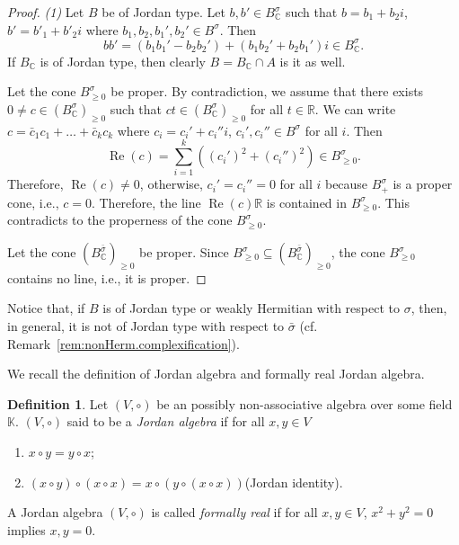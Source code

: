 \documentclass[a4paper,oneside,11pt]{amsart}
\DeclareMathOperator{\Ree}{Re}
\newcommand{\R}{\mathbb R}
\newcommand{\K}{\mathbb K}
\theoremstyle{plain}
\theoremstyle{definition}
\newtheorem{df}[teo]{Definition}
\theoremstyle{remark}
\newcommand{\defin}{\emph}
\begin{document}
\begin{proof}
    {\it (1)} Let $B$ be of Jordan type. Let $b,b'\in B_\mathbb C^\sigma$ such that $b=b_1+b_2i$, $b'=b'_1+b'_2i$ where $b_1,b_2,b_1',b_2'\in B^\sigma$. Then 
    $$bb'=(b_1b_1'-b_2b_2')+(b_1b_2'+b_2b_1')i\in B^\sigma_\mathbb C.$$
    If $B_\mathbb C$ is of Jordan type, then clearly $B=B_\mathbb C\cap A$ is it as well.

\vspace{2mm}
     Let the cone $B^\sigma_{\geq 0}$ be proper. By contradiction, we assume that there exists $0\neq c\in (B^\sigma_\mathbb C)_{\geq 0}$ such that $ct\in (B^\sigma_\mathbb C)_{\geq 0}$ for all $t\in\R$. We can write $c=\bar c_1 c_1+\dots+\bar c_k c_k$ where $c_i=c_i'+c_i''i$, $c_i',c_i''\in B^\sigma$ for all $i$. Then
    $$\Ree(c)=\sum_{i=1}^k\left((c_i')^2+(c_i'')^2\right)\in B^\sigma_{\geq 0}.$$
    Therefore, $\Ree(c)\neq 0$, otherwise, $c_i'=c_i''=0$ for all $i$ because $B^\sigma_+$ is a proper cone, i.e., $c=0$. Therefore, the line $\Ree(c)\R$ is contained in $B^\sigma_{\geq 0}$. This contradicts to the properness of the cone $B^\sigma_{\geq 0}$.

    Let the cone $(B^{\bar\sigma}_\mathbb C)_{\geq 0}$ be proper. Since $B^\sigma_{\geq 0}\subseteq (B^{\bar\sigma}_\mathbb C)_{\geq 0}$, the cone $B^\sigma_{\geq 0}$ contains no line, i.e., it is proper.
\end{proof}

\noindent Notice that, if $B$ is of Jordan type or weakly Hermitian with respect to $\sigma$, then, in general,  it is not of Jordan type with respect to $\bar\sigma$ (cf. Remark~\ref{rem:nonHerm.complexification}).

\vspace{2mm}
We recall the definition of Jordan algebra and formally real Jordan algebra.

\begin{df}
Let $(V,\circ)$ be an possibly non-associative algebra over some field $\K$. $(V,\circ)$ said to be a \defin{Jordan algebra} if for all $x,y\in V$
\begin{enumerate}
\item $x\circ y=y\circ x$;
\item $(x\circ y)\circ(x\circ x)=x\circ(y\circ(x\circ x))$\;\;(Jordan identity).
\end{enumerate}

A Jordan algebra $(V,\circ)$ is called \defin{formally real} if for all $x,y\in V$, $x^2+y^2=0$ implies $x,y=0$.
\end{df}
\end{document}
